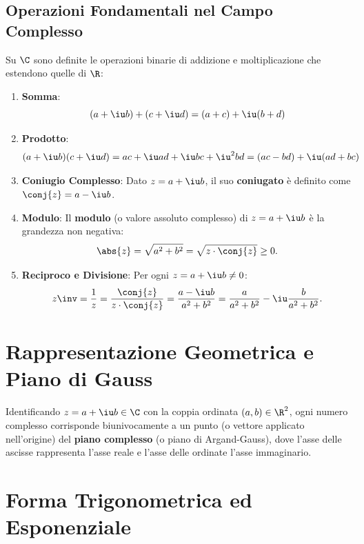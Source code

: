 \subsection{Operazioni Fondamentali nel Campo Complesso}
Su $\C$ sono definite le operazioni binarie di addizione e moltiplicazione che estendono quelle di $\R$:
\begin{enumerate}
    \item \textbf{Somma}:
    \begin{equation}
        (a + \iu b) + (c + \iu d) = (a + c) + \iu(b + d)
    \end{equation}
    \item \textbf{Prodotto}:
    \begin{equation}
        (a + \iu b)(c + \iu d) = ac + \iu ad + \iu bc + \iu^2 bd = (ac - bd) + \iu(ad + bc)
    \end{equation}
    \item \textbf{Coniugio Complesso}:
    Dato $z = a + \iu b$, il suo \textbf{coniugato} è definito come $\conj{z} = a - \iu b$.
    \item \textbf{Modulo}:
    Il \textbf{modulo} (o valore assoluto complesso) di $z = a + \iu b$ è la grandezza non negativa:
    \begin{equation}
        \abs{z} = \sqrt{a^2 + b^2} = \sqrt{z \cdot \conj{z}} \ge 0.
    \end{equation}
    \item \textbf{Reciproco e Divisione}:
    Per ogni $z = a + \iu b \neq 0$:
    \begin{equation}
        z\inv = \frac{1}{z} = \frac{\conj{z}}{z \cdot \conj{z}} = \frac{a - \iu b}{a^2 + b^2} = \frac{a}{a^2 + b^2} - \iu \frac{b}{a^2 + b^2}.
    \end{equation}
\end{enumerate}

\section{Rappresentazione Geometrica e Piano di Gauss}
Identificando $z = a + \iu b \in \C$ con la coppia ordinata $(a, b) \in \R^2$, ogni numero complesso corrisponde biunivocamente a un punto (o vettore applicato nell'origine) del \textbf{piano complesso} (o piano di Argand-Gauss), dove l'asse delle ascisse rappresenta l'asse reale e l'asse delle ordinate l'asse immaginario.

\section{Forma Trigonometrica ed Esponenziale}

